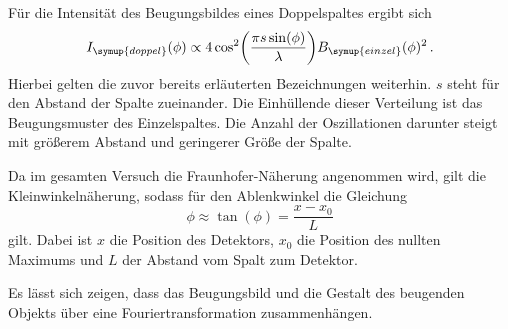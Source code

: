 Für die Intensität des Beugungsbildes eines Doppelspaltes ergibt sich
\begin{equation}
  I_{\symup{doppel}}(\phi) \propto 4 \cos^2\biggl(\frac{\pi s \sin(\phi)}{\lambda}\biggr)B_{\symup{einzel}}(\phi)^2 \,.
\end{equation}
Hierbei gelten die zuvor bereits erläuterten Bezeichnungen weiterhin. $s$ steht für
den Abstand der Spalte zueinander. Die Einhüllende dieser Verteilung ist das
Beugungsmuster des Einzelspaltes. Die Anzahl der Oszillationen darunter steigt mit
größerem Abstand und geringerer Größe der Spalte.

Da im gesamten Versuch die Fraunhofer-Näherung angenommen wird, gilt die Kleinwinkelnäherung,
sodass für den Ablenkwinkel die Gleichung
\begin{equation}
  \phi \approx \tan(\phi)=\frac{x-x_0}{L}
\end{equation}
gilt. Dabei ist $x$ die Position des Detektors, $x_0$ die Position des nullten Maximums
und $L$ der Abstand vom Spalt zum Detektor.

Es lässt sich zeigen, dass das Beugungsbild und die Gestalt des beugenden Objekts über eine
Fouriertransformation zusammenhängen.




